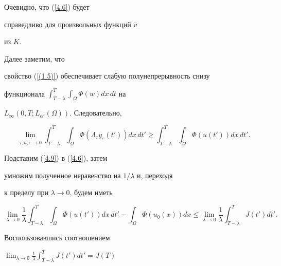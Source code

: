 Очевидно, что (\ref{4.6}) будет


справедливо  для произвольных функций $\overline{v}$


из $K.$





Далее заметим, что


свойство (\ref{(1.5)}) обеспечивает слабую полунепрерывность снизу


функционала $\int^{T}_{T-\lambda} \int_{\Omega} \Phi (w) dx\, dt$ на


$ L_{\infty}(0,T; L_{\alpha '}(\Omega) )$. Следовательно,


\begin{equation}


\lim_{\tau, \overline{\overline{h},\varepsilon \to }0 }


\int^{T}_{T-\lambda} \int_{\Omega}


\Phi (\Lambda_\tau y_\varepsilon (t')) dx\, dt'


\ge


\int^{T}_{T-\lambda} \int_{\Omega}


\Phi (u(t')) dx \,dt' . \label{4.9}


\end{equation}


Подставим (\ref{4.9}) в (\ref{4.6}), затем


умножим полученное неравенство на $1/\lambda$ и, переходя


к пределу при $\lambda \to 0$, будем иметь


\begin{equation}


\lim_{\lambda \to 0} \frac{1}{\lambda}


\int^{T}_{T-\lambda} \int_{\Omega}


\Phi (u(t')) dx\, dt' -


\int_{\Omega} \Phi (u_0(x))dx \le


\lim_{\lambda \to 0} \frac{1}{\lambda}


\int^{T}_{T-\lambda} J(t') dt' .\label{4.10}


\end{equation}


Воспользовавшись соотношением


$\lim_{\lambda \to 0} \frac{1}{\lambda}


\int^{T}_{T-\lambda} J(t') dt' = J(T) $




